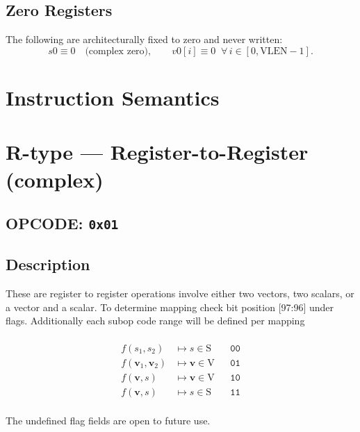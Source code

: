 \documentclass[10pt]{article}
\begin{document}
\subsection*{Zero Registers}
\noindent The following are architecturally fixed to zero and never written:
\[
s0 \equiv 0\quad\text{(complex zero)}, \qquad
v0[i] \equiv 0\;\; \forall\, i \in [0,\mathrm{VLEN}-1].
\]

\clearpage
\section*{Instruction Semantics}

\section*{R-type — Register-to-Register (complex)}
\subsection*{OPCODE: \texttt{0x01}}
\subsection*{Description}


These are register to register operations involve either two vectors, two scalars, or a vector and a scalar. To determine mapping check bit position [97:96] under flags. Additionally each subop code range will be defined per mapping\\\\

\[
\begin{aligned}
f(s_1,s_2)                 &\mapsto s \in \mathrm{S}            && \texttt{00} \\
f(\mathbf v_1,\mathbf v_2) &\mapsto \mathbf v \in \mathrm{V}    && \texttt{01} \\
f(\mathbf v,s)             &\mapsto \mathbf v \in \mathrm{V}    && \texttt{10} \\
f(\mathbf v,s)             &\mapsto s \in \mathrm{S}            && \texttt{11} \\
\end{aligned}
\]



The undefined flag fields are open to future use. 
\end{document}
